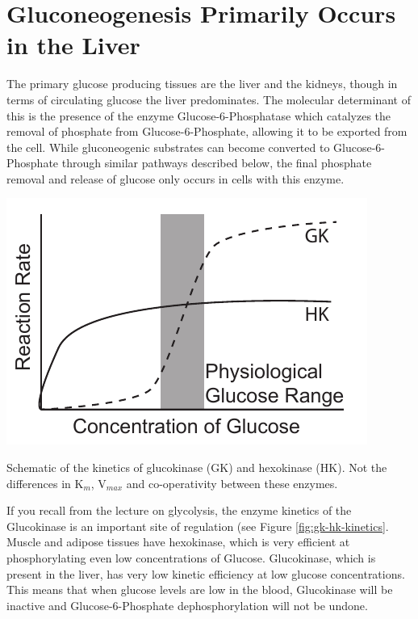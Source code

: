 \documentclass{tufte-handout}
\begin{document}
\section{Gluconeogenesis Primarily Occurs in the Liver}

The primary glucose producing tissues are the liver and the kidneys, though in terms of circulating glucose the liver predominates.  The molecular determinant of this is the presence of the enzyme Glucose-6-Phosphatase which catalyzes the removal of phosphate from Glucose-6-Phosphate, allowing it to be exported from the cell.  While gluconeogenic substrates can become converted to Glucose-6-Phosphate through similar pathways described below, the final phosphate removal and release of glucose only occurs in cells with this enzyme.

\begin{marginfigure}
\includegraphics{figures/gk-hk-kinetics.pdf}
\caption{Schematic of the kinetics of glucokinase (GK) and hexokinase (HK).  Not the differences in K$_m$, V$_{max}$ and co-operativity between these enzymes.}
\label{fig:gk-hk-kinetics}
\end{marginfigure}

  If you recall from the lecture on glycolysis, the enzyme kinetics of the Glucokinase is an important site of regulation (see Figure \ref{fig:gk-hk-kinetics}.  Muscle and adipose tissues have hexokinase, which is very efficient at phosphorylating even low concentrations of Glucose. Glucokinase, which is present in the liver, has very low kinetic efficiency at low glucose concentrations.  This means that when glucose levels are low in the blood, Glucokinase will be inactive and Glucose-6-Phosphate dephosphorylation will not be undone.
\end{document}
